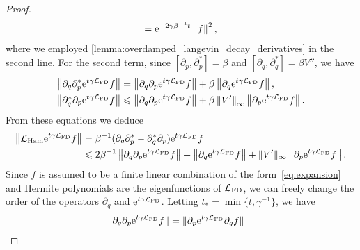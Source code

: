 \documentclass[11pt,a4paper]{article}
\newcommand{\e}{\mathrm{e}}
\newcommand{\commut}[2]{[#1, #2]}
\theoremstyle{plain}
\numberwithin{equation}{section}
\renewcommand{\leq}{\leqslant}
\begin{document}
\begin{proof}
\begin{align}
        = \e^{-2\gamma \beta^{-1} t} \norm{f}^2,
    \end{align}
    where we employed \cref{lemma:overdamped_langevin_decay_derivatives} in the second line.
    For the second term, since $\commut{\partial_p}{\partial_p^*} = \beta$ and $\commut{\partial_q}{\partial_q^*} = \beta V''$,
    we have
    \begin{align*}
        \norm{\partial_q \partial_p^* \e^{t \gamma \mathcal L_{\rm FD}} f}
        &= \norm{\partial_q \partial_p \e^{t \gamma \mathcal L_{\rm FD}} f} + \beta \norm{\partial_q \e^{t \gamma \mathcal L_{\rm FD}} f}, \\
        \norm{\partial_q^* \partial_p \e^{t \gamma \mathcal L_{\rm FD}} f}
        &\leq \norm{\partial_q \partial_p \e^{t \gamma \mathcal L_{\rm FD}} f}
        + \beta \norm{V'}[\infty] \norm{\partial_p \e^{t \gamma \mathcal L_{\rm FD}} f}.
    \end{align*}
    From these equations we deduce
    \begin{align}
        \notag
        \norm{\mathcal L_{\rm Ham} \e^{t \gamma \mathcal L_{\rm FD}} f}
        &= \beta^{-1} (\partial_q \partial_p^* - \partial_q^* \partial_p) \e^{t \gamma \mathcal L_{\rm FD}} f \\
        \label{eq:reasoning_action_lham}
        &\leq 2 \beta^{-1} \norm{\partial_q \partial_p \e^{t \gamma \mathcal L_{\rm FD}} f}
        + \norm{\partial_q \e^{t \gamma \mathcal L_{\rm FD}} f}
        + \norm*{V'}[\infty] \norm{\partial_p \e^{t \gamma \mathcal L_{\rm FD}} f}.
    \end{align}
    Since $f$ is assumed to be a finite linear combination of the form~\eqref{eq:expansion} and
    Hermite polynomials are the eigenfunctions of $\mathcal L_{\rm FD}$,
    we can freely change the order of the operators $\partial_q$ and $\e^{t \gamma \mathcal L_{\rm FD}}$.
    Letting $t_* = \min\{t, \gamma^{-1}\}$, we have
    \begin{align*}
        \norm*{\partial_q \partial_p \e^{t \gamma \mathcal L_{\rm FD}} f}
        &= \norm*{\partial_p \e^{t \gamma \mathcal L_{\rm FD}} \partial_q f}

\end{align*}
\end{proof}
\end{document}
